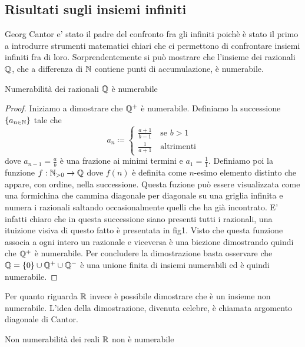\subsection{Risultati sugli insiemi infiniti}
Georg Cantor e' stato il padre del confronto fra gli infiniti poichè è stato il primo a introdurre strumenti matematici chiari che ci permettono di confrontare insiemi infiniti fra di loro.
Sorprendentemente si può mostrare che l'insieme dei razionali $\mathbb{Q}$, che a differenza di $\mathbb{N}$ contiene punti di accumulazione, è numerabile.
\begin{theorem}{Numerabilità dei razionali}
    $ \mathbb{Q} $ è numerabile
\end{theorem}
\begin{proof}
    Iniziamo a dimostrare che $\mathbb{Q}^+$ è numerabile.  Definiamo la successione $\{a_{n\in\mathbb{N}}\}$ tale che
    \begin{equation*}
        a_n \coloneqq \begin{cases}
        \frac{a+1}{b-1} \quad \text{se $b>1$} \\
        \frac{1}{a+1} \quad \text{altrimenti}
        \end{cases}
    \end{equation*}
    dove $a_{n-1} = \frac{a}{b}$ è una frazione ai minimi termini e $a_1 = \frac{1}{1}$. Definiamo poi la funzione $f:\mathbb{N}_{>0} \rightarrow \mathbb{Q}$ dove $f(n)$ è definita come $n$-esimo elemento distinto che appare, con ordine, nella successione.
    Questa fuzione può essere visualizzata come una formichina che cammina diagonale per diagonale su una griglia infinita e numera i razionali saltando occasionalmente quelli che ha già incontrato. E' infatti chiaro che in questa successione siano presenti tutti i razionali, una ituizione visiva di questo fatto è presentata in fig1. Visto che questa funzione associa a ogni intero un razionale e viceversa è una biezione dimostrando quindi che $\mathbb{Q}^+$ è numerabile.
    Per concludere la dimostrazione basta osservare che $\mathbb{Q} = \{0\}\cup\mathbb{Q}^+\cup\mathbb{Q}^-$ è una unione finita di insiemi numerabili ed è quindi numerabile.
\end{proof}
Per quanto riguarda $\mathbb{R}$ invece è possibile dimostrare che è un insieme non numerabile. L'idea della dimostrazione, divenuta celebre, è chiamata argomento diagonale di Cantor.
\begin{theorem}{Non numerabilità dei reali}
    $ \mathbb{R} $ non è numerabile
\end{theorem}

